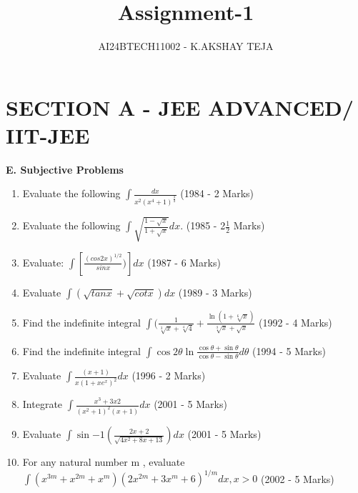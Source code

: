 \documentclass[journal,12pt,twocolumn]{IEEEtran}
\theoremstyle{remark}
\begin{document}

\vspace{3cm}

\title{Assignment-1}
\author{AI24BTECH11002 - K.AKSHAY TEJA}
\maketitle
\newpage
\bigskip

\renewcommand{\thefigure}{\theenumi}
\renewcommand{\thetable}{\theenumi}
\section{\textbf{SECTION A - JEE ADVANCED/ IIT-JEE}}

\textbf{E. Subjective Problems}
 \begin{enumerate}
    
\item   Evaluate the following $\int\frac{dx}{x^2(x^4 +1)^\frac{3}{4}} $ 
         \hfill  (1984 - 2 Marks)
\item   Evaluate the following $\int \sqrt{\frac{1 - \sqrt{x}}{1 + \sqrt{x}}}   dx$.\hfill
  (1985 - 2$\frac{1}{2}$ Marks)  


\item Evaluate: $\int$$[\frac{(cos2x)^{1/2}}{sin x})]dx$ \hfill  (1987 - 6 Marks)

\item   Evaluate {$\int(\sqrt{tan x}+\sqrt{cot x})dx$}      
  \hfill
(1989 - 3 Marks)
 

\item  Find the indefinite integral $\int$$(\frac{1}{\sqrt[3]{x} + \sqrt[4]{4}}+\frac{\ln (1+\sqrt[6]{x})}{\sqrt[3]{x}+\sqrt{x}}$  \hfill   (1992 - 4 Marks)

\item Find the indefinite integral \(\int \cos 2\theta \ln \frac{\cos \theta + \sin \theta}{\cos \theta - \sin \theta}   d\theta\) \hfill  (1994 - 5 Marks)


\item  Evaluate $\int\frac{(x + 1)}{x(1 + xe^x)^2}dx$  \hfill (1996 - 2 Marks)

\item Integrate $\int\frac{x^{3}+3x 2}{(x^{2}+ 1)^{2}(x + 1)}dx$ \hfill  (2001 - 5 Marks)

\item   Evaluate $\int \sin{-1} (\frac{2x + 2}{\sqrt{4x^{2}+8x+13}})dx$    \hfill    (2001 - 5 Marks)

\item  For any natural number m , evaluate ${\int(x^{3m} + x^{2m}+x^{m})(2x^{2m}+3x^{m}+6)^{1/m}dx,x>0}$   \hfill   (2002 - 5 Marks)
 
\end{enumerate}
\end{document}
